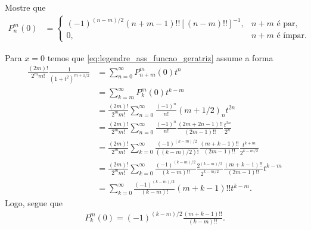 \documentclass[a4paper,12pt, leqno, answers]{exam}
\begin{document}
\begin{questions}
    \question Mostre que
    \begin{align*}
        P_n^m(0) &= \begin{cases}
            (-1)^{(n - m)/2} (n + m - 1)!! \left[ (n - m)!! \right]^{-1}, & \text{$n + m$ \'{e} par,} \\
            0, & \text{$n + m$ \'{e} \'{i}mpar.}
        \end{cases}
    \end{align*}
    \begin{solution}
        Para $x = 0$ temos que \eqref{eq:legendre_ass_funcao_geratriz} assume a forma
        \begin{align*}
            \frac{(2 m)!}{2^m m!} \frac{1}{(1 + t^2)^{m + 1/2}} &= \sum_{n = 0}^\infty P_{n + m}^m(0) t^n \\
            &= \sum_{k = m}^\infty P_k^m(0) t^{k - m} \\
            &= \frac{(2 m)!}{2^m m!} \sum_{n = 0}^\infty \frac{(-1)^n}{n!} (m + 1/2)_n t^{2n} \\
            &= \frac{(2 m)!}{2^m m!} \sum_{n = 0}^\infty \frac{(-1)^n}{n!} \frac{(2 m + 2 n - 1)!!}{(2 m - 1)!!} \frac{t^{2n}}{2^n} \\
            &= \frac{(2 m)!}{2^m m!} \sum_{k = 0}^\infty \frac{(-1)^{(k - m)/2}}{\left( (k - m)/2 \right)!} \frac{(m + k - 1)!!}{(2 m - 1)!!} \frac{t^{k + m}}{2^{k - m/2}} \\
            &= \frac{(2 m)!}{2^m m!} \sum_{k = 0}^\infty \frac{(-1)^{(k - m)/2}}{(k - m)!!} \frac{2^{(k - m)/2}}{2^{k - m/2}} \frac{(m + k - 1)!!}{(2 m - 1)!!} t^{k - m} \\
            &= \sum_{k = 0}^\infty \frac{(-1)^{(k - m)/2}}{(k - m)!} (m + k - 1)!! t^{k - m}.
        \end{align*}
        Logo, segue que
        \begin{align*}
            P_k^m(0) = (-1)^{(k - m)/2} \frac{(m + k - 1)!!}{(k - m)!!}.
        \end{align*}
    \end{solution}


\end{questions}
\end{document}

